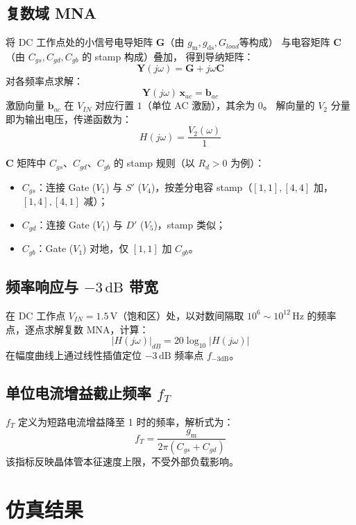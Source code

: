 \documentclass[12pt, a4paper]{article}
\newcommand{\gm}{g_{\mathrm{m}}}
\newcommand{\gds}{g_{\mathrm{ds}}}
\begin{document}
\subsection{复数域 MNA}

将 DC 工作点处的小信号电导矩阵 $\bm{G}$（由 $\gm,\gds,G_{load}$等构成）
与电容矩阵 $\bm{C}$（由 $C_{gs},C_{gd},C_{gb}$ 的 stamp 构成）叠加，
得到导纳矩阵：
\[
  \bm{Y}(j\omega) = \bm{G} + j\omega\bm{C}
\]
对各频率点求解：
\[
  \bm{Y}(j\omega)\,\bm{x}_{ac} = \bm{b}_{ac}
\]
激励向量 $\bm{b}_{ac}$ 在 $V_{IN}$ 对应行置 $1$（单位 AC 激励），其余为 $0$。
解向量的 $V_2$ 分量即为输出电压，传递函数为：
\[
  H(j\omega) = \frac{V_2(\omega)}{1}
\]

$\bm{C}$ 矩阵中 $C_{gs}$、$C_{gd}$、$C_{gb}$ 的 stamp 规则（以 $R_d>0$ 为例）：
\begin{itemize}
  \item $C_{gs}$：连接 Gate ($V_1$) 与 $S'$ ($V_4$)，按差分电容 stamp（$[1,1],[4,4]$ 加，$[1,4],[4,1]$ 减）；
  \item $C_{gd}$：连接 Gate ($V_1$) 与 $D'$ ($V_5$)，stamp 类似；
  \item $C_{gb}$：Gate ($V_1$) 对地，仅 $[1,1]$ 加 $C_{gb}$。
\end{itemize}

\subsection{频率响应与 $-3\,\mathrm{dB}$ 带宽}

在 DC 工作点 $V_{IN}=1.5\,\mathrm{V}$（饱和区）处，以对数间隔取
$10^6\sim10^{12}\,\mathrm{Hz}$ 的频率点，逐点求解复数 MNA，计算：
\[
  |H(j\omega)|_{dB} = 20\log_{10}|H(j\omega)|
\]
在幅度曲线上通过线性插值定位 $-3\,\mathrm{dB}$ 频率点 $f_{-3\mathrm{dB}}$。

\subsection{单位电流增益截止频率 $f_T$}

$f_T$ 定义为短路电流增益降至 1 时的频率，解析式为：
\[
  f_T = \frac{\gm}{2\pi(C_{gs}+C_{gd})}
\]
该指标反映晶体管本征速度上限，不受外部负载影响。

\section{仿真结果}
\end{document}

